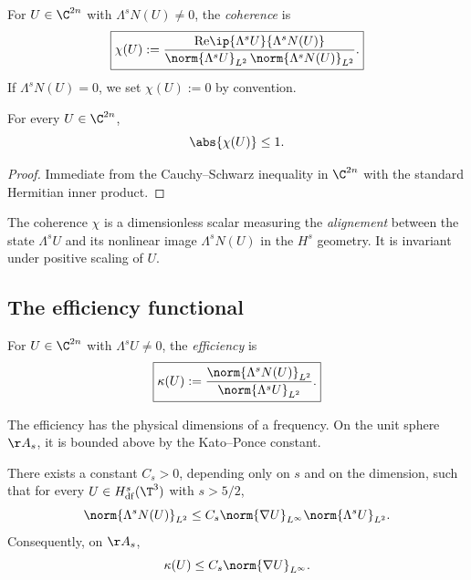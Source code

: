 \begin{definition}[Coherence]\label{part-2:def:chi}
For $U\in\C^{2n}$ with $\Lambda^s N(U)\neq 0$, the \emph{coherence} is
\begin{equation}\label{part-2:eq:chi-def}
\boxed{
\chi(U) := 
\frac{\mathrm{Re}\ip{\Lambda^s U}{\Lambda^s N(U)}}
     {\norm{\Lambda^s U}_{L^2}\,\norm{\Lambda^s N(U)}_{L^2}}.
}
\end{equation}
If $\Lambda^s N(U) = 0$, we set $\chi(U) := 0$ by convention.
\end{definition}

\begin{proposition}\label{part-2:prop:chi-bound}
For every $U\in\C^{2n}$,
\begin{equation}\label{part-2:eq:chi-bound}
\abs{\chi(U)} \leq 1.
\end{equation}
\end{proposition}

\begin{proof}
Immediate from the Cauchy--Schwarz inequality in $\C^{2n}$ with the 
standard Hermitian inner product.
\end{proof}

The coherence $\chi$ is a dimensionless scalar measuring the 
\emph{alignement} between the state $\Lambda^s U$ and its nonlinear 
image $\Lambda^s N(U)$ in the $H^s$ geometry. It is invariant under 
positive scaling of $U$.

\subsection{The efficiency functional}
\label{part-2:ssec:kappa}

\begin{definition}[Efficiency]\label{part-2:def:kappa}
For $U\in\C^{2n}$ with $\Lambda^s U\neq 0$, the \emph{efficiency} is
\begin{equation}\label{part-2:eq:kappa-def}
\boxed{
\kappa(U) := \frac{\norm{\Lambda^s N(U)}_{L^2}}{\norm{\Lambda^s U}_{L^2}}.
}
\end{equation}
\end{definition}

The efficiency has the physical dimensions of a frequency. On the 
unit sphere $\AA_s$, it is bounded above by the Kato--Ponce constant.

\begin{theorem}\label{part-2:thm:KP}
There exists a constant $C_s>0$, depending only on $s$ and on the 
dimension, such that for every $U\in H^s_{\mathrm{df}}(\T^3)$ with 
$s>5/2$,
\begin{equation}\label{part-2:eq:KP-bound}
\norm{\Lambda^s N(U)}_{L^2} 
\leq C_s \norm{\nabla U}_{L^\infty} \norm{\Lambda^s U}_{L^2}.
\end{equation}
Consequently, on $\AA_s$,
\begin{equation}\label{part-2:eq:kappa-bound}
\kappa(U) \leq C_s \norm{\nabla U}_{L^\infty}.
\end{equation}
\end{theorem}

